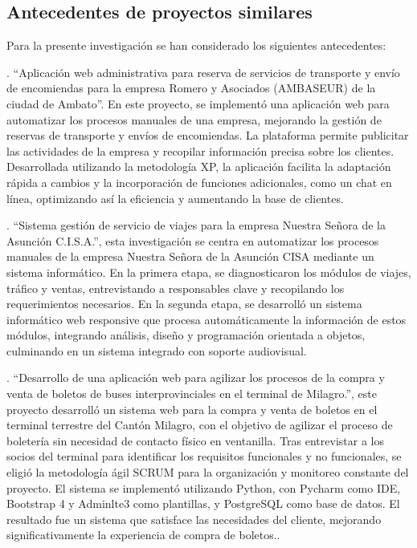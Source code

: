 	\subsection{Antecedentes de proyectos similares}
	
	Para la presente investigación se han considerado los siguientes antecedentes:
	
	\textcite{hurtado2019aplicacion}. ``Aplicación web administrativa para reserva de servicios de transporte y envío de encomiendas para la empresa Romero y Asociados (AMBASEUR) de la ciudad de Ambato''. En este proyecto, se implementó una aplicación web para automatizar los procesos manuales de una empresa, mejorando la gestión de reservas de transporte y envíos de encomiendas. La plataforma permite publicitar las actividades de la empresa y recopilar información precisa sobre los clientes. Desarrollada utilizando la metodología XP, la aplicación facilita la adaptación rápida a cambios y la incorporación de funciones adicionales, como un chat en línea, optimizando así la eficiencia y aumentando la base de clientes.
	
	\textcite{mora2022sistema}. ``Sistema gestión de servicio de viajes para la empresa Nuestra Señora de la Asunción C.I.S.A.'', esta investigación se centra en automatizar los procesos manuales de la empresa Nuestra Señora de la Asunción CISA mediante un sistema informático. En la primera etapa, se diagnosticaron los módulos de viajes, tráfico y ventas, entrevistando a responsables clave y recopilando los requerimientos necesarios. En la segunda etapa, se desarrolló un sistema informático web responsive que procesa automáticamente la información de estos módulos, integrando análisis, diseño y programación orientada a objetos, culminando en un sistema integrado con soporte audiovisual.
	
	\textcite{arevalo2021desarrollo}. ``Desarrollo de una aplicación web para
	agilizar los procesos de la compra y venta de boletos de buses interprovinciales en el terminal de Milagro.'', este proyecto desarrolló un sistema web para la compra y venta de boletos en el terminal terrestre del Cantón Milagro, con el objetivo de agilizar el proceso de boletería sin necesidad de contacto físico en ventanilla. Tras entrevistar a los socios del terminal para identificar los requisitos funcionales y no funcionales, se eligió la metodología ágil SCRUM para la organización y monitoreo constante del proyecto. El sistema se implementó utilizando Python, con Pycharm como IDE, Bootstrap 4 y Adminlte3 como plantillas, y PostgreSQL como base de datos. El resultado fue un sistema que satisface las necesidades del cliente, mejorando significativamente la experiencia de compra de boletos..
	
